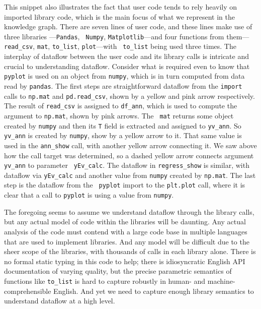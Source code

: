 This snippet also illustrates the fact that user code tends to rely
heavily on imported library code, which is the main focus of what we
represent in the knowledge graph.  There are seven lines of user code,
and these lines make use of three libraries ---{\tt Pandas}, {\tt
Numpy}, {\tt Matplotlib}---and four functions from them---{\tt
read\_csv}, {\tt mat}, {\tt to\_list}, {\tt plot}---with {\tt
to\_list} being used three times.  The interplay of dataflow between
the user code and its library calls is intricate and crucial to
understanding dataflow.  Consider what is required even to know that
{\tt pyplot} is used on an object from {\tt numpy}, which is in turn
computed from data read by {\tt pandas}.  The first steps are
straightforward dataflow from the {\tt import} calls to {\tt np.mat}
and {\tt pd.read\_csv}, shown by a yellow and pink arrow respectively.
The result of {\tt read\_csv} is assigned to {\tt df\_ann}, which is
used to compute the argument to {\tt np.mat}, shown by pink arrows.  The {\tt
mat} returns some object created by {\tt numpy} and then its {\tt T}
field is extracted and assigned to {\tt yv\_ann}.  So {\tt yv\_ann} is
created by {\tt numpy}, show by a yellow arrow to it.  That same value
is used in the {\tt ann\_show} call, with another yellow arrow
connecting it.  We saw above how the call target was determined, so a
dashed yellow arrow connects argument {\tt yv\_ann} to parameter {\tt
yEv\_calc}.  The dataflow in {\tt regress\_show} is similar, with
dataflow via {\tt yEv\_calc} and another value from {\tt numpy}
created by {\tt np.mat}.  The last step is the dataflow from the {\tt
pyplot} import to the {\tt plt.plot} call, where it is clear that a
call to {\tt pyplot} is using a value from {\tt numpy}.

The foregoing seems to assume we understand dataflow through the library
calls, but any actual model of code within the libraries will be daunting.  Any
actual analysis of the code must contend with a large code base in
multiple languages that are used to implement libraries.  
And any model will be difficult due to the sheer
scope of the libraries, with thousands of calls in each library alone.  There
is no formal static typing in this code to help; there is
idiosyncratic English API documentation of varying quality, but the
precise parametric semantics of functions like {\tt to\_list} is hard
to capture robustly in human- and machine-comprehensible English.  And
yet we need to capture enough library semantics to understand dataflow
at a high level.

